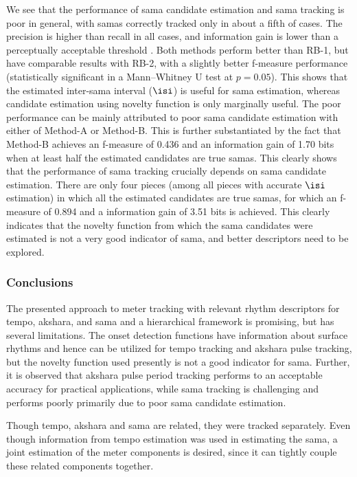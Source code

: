 We see that the performance of \gls{sama} candidate estimation and \gls{sama} tracking is poor in general, with \glspl{sama} correctly tracked only in about a fifth of cases. The precision is higher than recall in all cases, and information gain is lower than a perceptually acceptable threshold \cite{zapata:12:beat}. Both methods perform better than RB-1, but have comparable results with RB-2, with a slightly better f-measure performance (statistically significant in a Mann–Whitney U test at $p=0.05$). This shows that the estimated inter-\gls{sama} interval ($\isi$) is useful for \gls{sama} estimation, whereas candidate estimation using novelty function is only marginally useful. The poor performance can be mainly attributed to poor \gls{sama} candidate estimation with either of Method-A or Method-B. This is further substantiated by the fact that Method-B achieves an f-measure of 0.436 and an information gain of 1.70 bits when at least half the estimated candidates are true \glspl{sama}. This clearly shows that the performance of \gls{sama} tracking crucially depends on \gls{sama} candidate estimation. There are only four pieces (among all pieces with accurate $\isi$ estimation) in which all the estimated candidates are true \glspl{sama}, for which an f-measure of 0.894 and a information gain of 3.51 bits is achieved. This clearly indicates that the novelty function from which the \gls{sama} candidates were estimated is not a very good indicator of \gls{sama}, and better descriptors need to be explored. 
\subsubsection{Conclusions}

The presented approach to meter tracking with relevant rhythm descriptors for tempo, \gls{akshara}, and \gls{sama} and a hierarchical framework is promising, but has several limitations. The onset detection functions have information about surface rhythms and hence can be utilized for tempo tracking and \gls{akshara} pulse tracking, but the novelty function used presently is not a good indicator for sama. Further, it is observed that \gls{akshara} pulse period tracking performs to an acceptable accuracy for practical applications, while \gls{sama} tracking is challenging and performs poorly primarily due to poor \gls{sama} candidate estimation. 

Though tempo, \gls{akshara} and \gls{sama} are related, they were tracked separately. Even though information from tempo estimation was used in estimating the \gls{sama}, a joint estimation of the meter components is desired, since it can tightly couple these related components together. 

